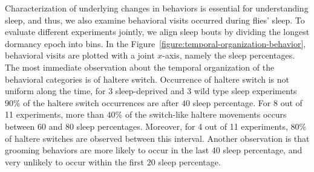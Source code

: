 Characterization of underlying changes in behaviors is essential for understanding sleep, and thus, we also examine behavioral visits occurred during flies' sleep.
To evaluate different experiments jointly, we align sleep bouts by dividing the longest dormancy epoch into bins.
In the Figure~\ref{figure:temporal-organization-behavior}, behavioral visits are plotted with a joint $x$-axis, namely the sleep percentages.
The most immediate observation about the temporal organization of the behavioral categories is of haltere switch.
Occurrence of haltere switch is not uniform along the time, for 3 sleep-deprived and 3 wild type sleep experiments $90\%$ of the haltere switch occurrences are after $40$ sleep percentage.
For 8 out of 11 experiments, more than $40\%$ of the switch-like haltere movements occurs between $60$ and $80$ sleep percentages.
Moreover, for 4 out of 11 experiments, $80\%$ of haltere switches are observed between this interval.
Another observation is that grooming behaviors are more likely to occur in the last $40$ sleep percentage, and very unlikely to occur within the first $20$ sleep percentage.
